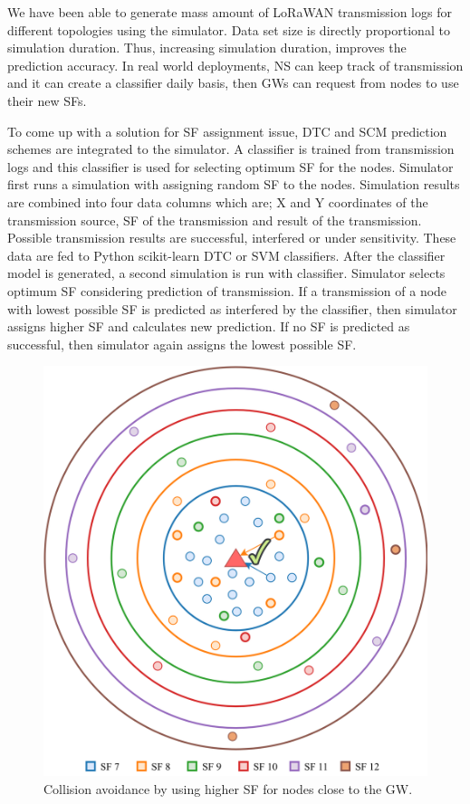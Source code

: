\documentclass[conference]{IEEEtran}
\begin{document}
\par We have been able to generate mass amount of LoRaWAN transmission logs for different topologies using the simulator. Data set size is directly proportional to simulation duration. Thus, increasing simulation duration, improves the prediction accuracy. In real world deployments, NS can keep track of transmission and it can create a classifier daily basis, then GWs can request from nodes to use their new SFs.

\par To come up with a solution for SF assignment issue, DTC and SCM prediction schemes are integrated to the simulator. A classifier is trained from transmission logs and this classifier is used for selecting optimum SF for the nodes. Simulator first runs a simulation with assigning random SF to the nodes. Simulation results are combined into four data columns which are; X and Y coordinates of the transmission source, SF of the transmission and result of the transmission. Possible transmission results are successful, interfered or under sensitivity. These data are fed to Python scikit-learn DTC or SVM classifiers. After the classifier model is generated, a second simulation is run with classifier. Simulator selects optimum SF considering prediction of transmission. If a transmission of a node with lowest possible SF is predicted as interfered by the classifier, then simulator assigns higher SF and calculates new prediction. If no SF is predicted as successful, then simulator again assigns the lowest possible SF.

\begin{figure}
\centering
\includegraphics[width=\linewidth]{collision_solution_single_gw}
\caption{Collision avoidance by using higher SF for nodes close to the GW.}
\label{fig:collision_solution_single_gw}
\end{figure}
\end{document}
